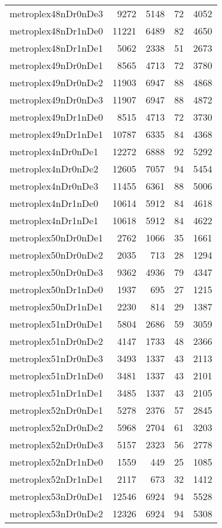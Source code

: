 \begin{longtable}{lrrrr}
metroplex48nDr0nDe3 & 9272 & 5148 & 72 & 4052 \\
metroplex48nDr1nDe0 & 11221 & 6489 & 82 & 4650 \\
metroplex48nDr1nDe1 & 5062 & 2338 & 51 & 2673 \\
metroplex49nDr0nDe1 & 8565 & 4713 & 72 & 3780 \\
metroplex49nDr0nDe2 & 11903 & 6947 & 88 & 4868 \\
metroplex49nDr0nDe3 & 11907 & 6947 & 88 & 4872 \\
metroplex49nDr1nDe0 & 8515 & 4713 & 72 & 3730 \\
metroplex49nDr1nDe1 & 10787 & 6335 & 84 & 4368 \\
metroplex4nDr0nDe1 & 12272 & 6888 & 92 & 5292 \\
metroplex4nDr0nDe2 & 12605 & 7057 & 94 & 5454 \\
metroplex4nDr0nDe3 & 11455 & 6361 & 88 & 5006 \\
metroplex4nDr1nDe0 & 10614 & 5912 & 84 & 4618 \\
metroplex4nDr1nDe1 & 10618 & 5912 & 84 & 4622 \\
metroplex50nDr0nDe1 & 2762 & 1066 & 35 & 1661 \\
metroplex50nDr0nDe2 & 2035 & 713 & 28 & 1294 \\
metroplex50nDr0nDe3 & 9362 & 4936 & 79 & 4347 \\
metroplex50nDr1nDe0 & 1937 & 695 & 27 & 1215 \\
metroplex50nDr1nDe1 & 2230 & 814 & 29 & 1387 \\
metroplex51nDr0nDe1 & 5804 & 2686 & 59 & 3059 \\
metroplex51nDr0nDe2 & 4147 & 1733 & 48 & 2366 \\
metroplex51nDr0nDe3 & 3493 & 1337 & 43 & 2113 \\
metroplex51nDr1nDe0 & 3481 & 1337 & 43 & 2101 \\
metroplex51nDr1nDe1 & 3485 & 1337 & 43 & 2105 \\
metroplex52nDr0nDe1 & 5278 & 2376 & 57 & 2845 \\
metroplex52nDr0nDe2 & 5968 & 2704 & 61 & 3203 \\
metroplex52nDr0nDe3 & 5157 & 2323 & 56 & 2778 \\
metroplex52nDr1nDe0 & 1559 & 449 & 25 & 1085 \\
metroplex52nDr1nDe1 & 2117 & 673 & 32 & 1412 \\
metroplex53nDr0nDe1 & 12546 & 6924 & 94 & 5528 \\
metroplex53nDr0nDe2 & 12326 & 6924 & 94 & 5308 \\

\end{longtable}
